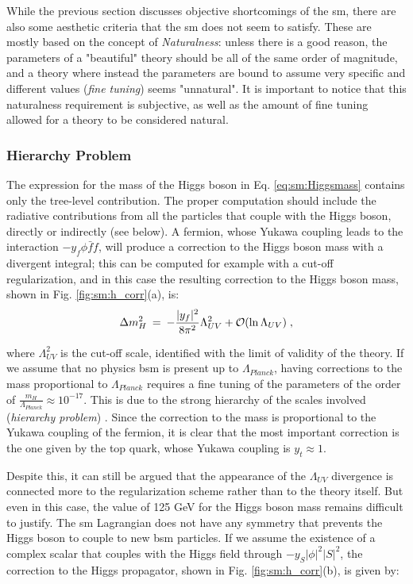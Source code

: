 While the previous section discusses objective shortcomings of the \gls{sm}, there are also some aesthetic criteria that the \gls{sm} does not seem to satisfy. These are mostly based on the concept of \textit{Naturalness}: unless there is a good reason, the parameters of a "beautiful" theory should be all of the same order of magnitude, and a theory where instead the parameters are bound to assume very specific and different values (\textit{fine tuning}) seems "unnatural". It is important to notice that this naturalness requirement is subjective, as well as the amount of fine tuning allowed for a theory to be considered natural.


\subsubsection*{Hierarchy Problem}

The expression for the mass of the Higgs boson in Eq. \ref{eq:sm:Higgsmass} contains only the tree-level contribution. The proper computation should include the radiative contributions from all the particles that couple with the Higgs boson, directly or indirectly (see below). A fermion, whose Yukawa coupling leads to the interaction $-y_f \phi \bar{f} f$, will produce a correction to the Higgs boson mass with a divergent integral; this can be computed for example with a cut-off regularization, and in this case the resulting correction to the Higgs boson mass, shown in Fig. \ref{fig:sm:h_corr}(a), is:
\begin{equation}
\Delta m_H^2 \>=\>  
-{|y_f|^2\over 8 \pi^2} \Lambda_{UV}^2 + \mathcal{O}(\ln \Lambda_{UV} ) \; ,
\label{eq:divhf}
\end{equation}

\noindent where $\Lambda_{UV}^2$ is the cut-off scale, identified with the limit of validity of the theory. If we assume that no physics \gls{bsm} is present up to $\Lambda_{Planck}$, having corrections to the mass proportional to $\Lambda_{Planck}$ requires a fine tuning of the parameters of the order of $\frac{m_H}{\Lambda_{Planck}} \approx 10^{-17}$. This is due to the strong hierarchy of the scales involved (\textit{hierarchy problem}) \cite{Weinberg:1975gm, PhysRevD.20.2619, PhysRevD.14.1667, tHooft:1979rat}. Since the correction to the mass is proportional to the Yukawa coupling of the fermion, it is clear that the most important correction is the one given by the top quark, whose Yukawa coupling is $y_t \approx 1$. %

Despite this, it can still be argued that the appearance of the $\Lambda_{UV}$ divergence is connected more to the regularization scheme rather than to the theory itself. But even in this case, the value of 125 GeV for the Higgs boson mass remains difficult to justify. The \gls{sm} Lagrangian does not have any symmetry that prevents the Higgs boson to couple to new \gls{bsm} particles. If we assume the existence of a complex scalar that couples with the Higgs field through $ -y_S|\phi|^2 |S|^2$, the correction to the Higgs propagator, shown in Fig. \ref{fig:sm:h_corr}(b), is given by:

